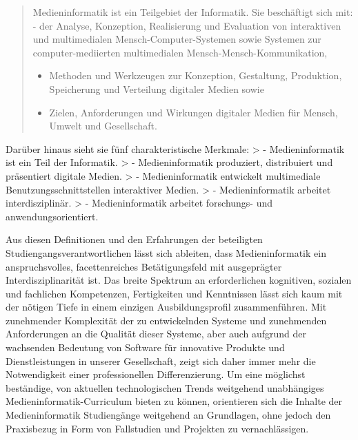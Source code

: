 \begin{quote}
Medieninformatik ist ein Teilgebiet der Informatik. Sie beschäftigt sich
mit: - der Analyse, Konzeption, Realisierung und Evaluation von
interaktiven und multimedialen Mensch-Computer-Systemen sowie Systemen
zur computer-mediierten multimedialen Mensch-Mensch-Kommunikation,

\begin{itemize}
\tightlist
\item
  Methoden und Werkzeugen zur Konzeption, Gestaltung, Produktion,
  Speicherung und Verteilung digitaler Medien sowie
\item
  Zielen, Anforderungen und Wirkungen digitaler Medien für Mensch,
  Umwelt und Gesellschaft.
\end{itemize}
\end{quote}

Darüber hinaus sieht sie fünf charakteristische Merkmale: \textgreater{}
- Medieninformatik ist ein Teil der Informatik. \textgreater{} -
Medieninformatik produziert, distribuiert und präsentiert digitale
Medien. \textgreater{} - Medieninformatik entwickelt multimediale
Benutzungsschnittstellen interaktiver Medien. \textgreater{} -
Medieninformatik arbeitet interdisziplinär. \textgreater{} -
Medieninformatik arbeitet forschungs- und anwendungsorientiert.

Aus diesen Definitionen und den Erfahrungen der beteiligten
Studiengangsverantwortlichen lässt sich ableiten, dass Medieninformatik
ein anspruchsvolles, facettenreiches Betätigungsfeld mit ausgeprägter
Interdisziplinarität ist. Das breite Spektrum an erforderlichen
kognitiven, sozialen und fachlichen Kompetenzen, Fertigkeiten und
Kenntnissen lässt sich kaum mit der nötigen Tiefe in einem einzigen
Ausbildungsprofil zusammenführen. Mit zunehmender Komplexität der zu
entwickelnden Systeme und zunehmenden Anforderungen an die Qualität
dieser Systeme, aber auch aufgrund der wachsenden Bedeutung von Software
für innovative Produkte und Dienstleistungen in unserer Gesellschaft,
zeigt sich daher immer mehr die Notwendigkeit einer professionellen
Differenzierung. Um eine möglichst beständige, von aktuellen
technologischen Trends weitgehend unabhängiges
Medieninformatik-Curriculum bieten zu können, orientieren sich die
Inhalte der Medieninformatik Studiengänge weitgehend an Grundlagen, ohne
jedoch den Praxisbezug in Form von Fallstudien und Projekten zu
vernachlässigen.

